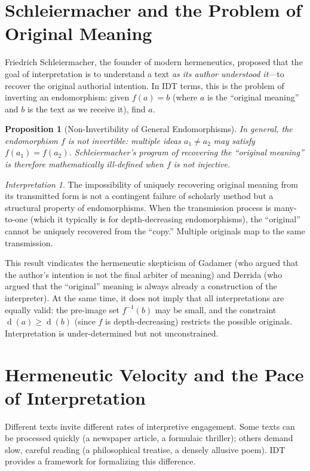 \documentclass[11pt,openany]{book}
\theoremstyle{definition}
\theoremstyle{plain}
\newtheorem{proposition}[axiom]{Proposition}
\theoremstyle{remark}
\newtheorem{interpretation}[axiom]{Interpretation}
\newcommand{\depth}{\operatorname{d}}       %
\begin{document}
\section{Schleiermacher and the Problem of Original Meaning}

Friedrich Schleiermacher, the founder of modern hermeneutics, proposed that the goal of interpretation is to understand a text \emph{as its author understood it}---to recover the original authorial intention. In IDT terms, this is the problem of inverting an endomorphism: given $f(a) = b$ (where $a$ is the ``original meaning'' and $b$ is the text as we receive it), find $a$.

\begin{proposition}[Non-Invertibility of General Endomorphisms]
In general, the endomorphism $f$ is not invertible: multiple ideas $a_1 \neq a_2$ may satisfy $f(a_1) = f(a_2)$. Schleiermacher's program of recovering the ``original meaning'' is therefore mathematically ill-defined when $f$ is not injective.
\end{proposition}

\begin{interpretation}
The impossibility of uniquely recovering original meaning from its transmitted form is not a contingent failure of scholarly method but a structural property of endomorphisms. When the transmission process is many-to-one (which it typically is for depth-decreasing endomorphisms), the ``original'' cannot be uniquely recovered from the ``copy.'' Multiple originals map to the same transmission.

This result vindicates the hermeneutic skepticism of Gadamer (who argued that the author's intention is not the final arbiter of meaning) and Derrida (who argued that the ``original'' meaning is always already a construction of the interpreter). At the same time, it does not imply that all interpretations are equally valid: the pre-image set $f^{-1}(b)$ may be small, and the constraint $\depth(a) \geq \depth(b)$ (since $f$ is depth-decreasing) restricts the possible originals. Interpretation is under-determined but not unconstrained.
\end{interpretation}

\section{Hermeneutic Velocity and the Pace of Interpretation}

Different texts invite different rates of interpretive engagement. Some texts can be processed quickly (a newspaper article, a formulaic thriller); others demand slow, careful reading (a philosophical treatise, a densely allusive poem). IDT provides a framework for formalizing this difference.
\end{document}
